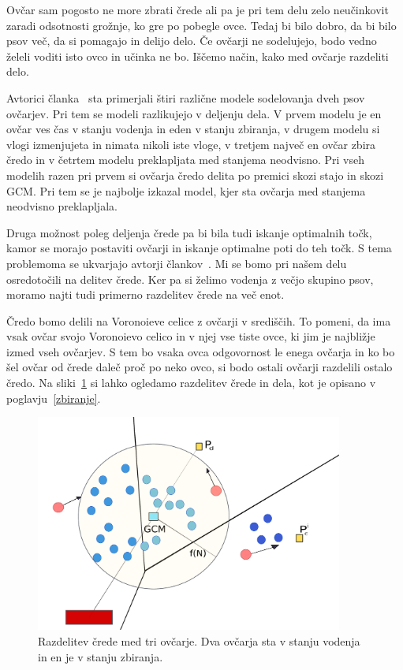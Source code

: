 Ovčar sam pogosto ne more zbrati črede ali pa je pri tem delu zelo neučinkovit zaradi odsotnosti grožnje, ko gre po pobegle ovce. Tedaj bi bilo dobro, da bi bilo psov več, da si pomagajo in delijo delo. Če ovčarji ne sodelujejo, bodo vedno želeli voditi isto ovco in učinka ne bo. Iščemo način, kako med ovčarje razdeliti delo.

Avtorici članka~\cite{aiba2020suggestion} sta primerjali štiri različne modele sodelovanja dveh psov ovčarjev. Pri tem se modeli razlikujejo v deljenju dela. V prvem modelu je en ovčar ves čas v stanju vodenja in eden v stanju zbiranja, v drugem modelu si vlogi izmenjujeta in nimata nikoli iste vloge, v tretjem največ en ovčar zbira čredo in v četrtem modelu preklapljata med stanjema neodvisno. Pri vseh modelih razen pri prvem si ovčarja čredo delita po premici skozi stajo in skozi GCM. Pri tem se je najbolje izkazal model, kjer sta ovčarja med stanjema neodvisno preklapljala.

Druga možnost poleg deljenja črede pa bi bila tudi iskanje optimalnih točk, kamor se morajo postaviti ovčarji in iskanje optimalne poti do teh točk. S tema problemoma se ukvarjajo avtorji člankov~\cite{lien2005shepherding, pierson2017controlling, pierson2015bio, lee2017autonomous}. Mi se bomo pri našem delu osredotočili na delitev črede. Ker pa si želimo vodenja z večjo skupino psov, moramo najti tudi primerno razdelitev črede na več enot.

Čredo bomo delili na Voronoieve celice z ovčarji v središčih. To pomeni, da ima vsak ovčar svojo Voronoievo celico in v njej vse tiste ovce, ki jim je najbližje izmed vseh ovčarjev. S tem bo vsaka ovca odgovornost le enega ovčarja in ko bo šel ovčar od črede daleč proč po neko ovco, si bodo ostali ovčarji razdelili ostalo čredo. Na sliki~\ref{fig:voronoi} si lahko ogledamo razdelitev črede in dela, kot je opisano v poglavju~\ref{zbiranje}.

\begin{figure}[ht]  %
	\centering
	\includegraphics[width=0.9\textwidth]{../poglavja/images/voronoi.pdf}
	\caption[Razdelitev črede in nalog]{Razdelitev črede med tri ovčarje. Dva ovčarja sta v stanju vodenja in en je v stanju zbiranja.} %
	\label{fig:voronoi}
\end{figure}

